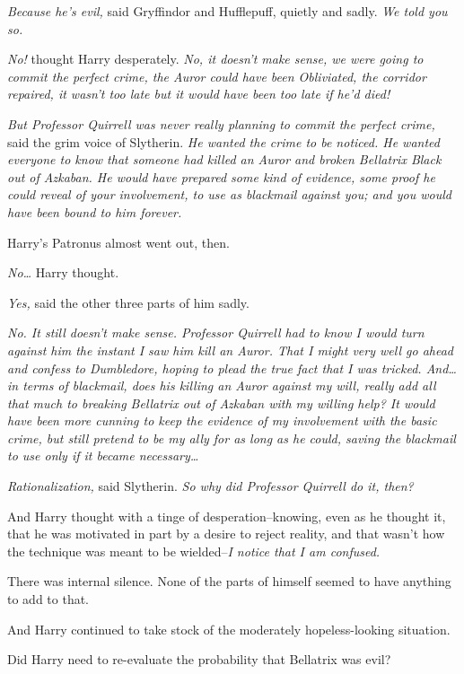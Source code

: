 \emph{Because he's evil,} said Gryffindor and Hufflepuff, quietly and sadly. \emph{We told you so.}

\emph{No!} thought Harry desperately. \emph{No, it doesn't make sense, we were going to commit the perfect crime, the Auror could have been Obliviated, the corridor repaired, it wasn't too late but it \emph{would} have been too late if he'd died!}

\emph{But Professor Quirrell was never really planning to commit the perfect crime,} said the grim voice of Slytherin. \emph{He \emph{wanted} the crime to be noticed. He wanted everyone to know that someone had killed an Auror and broken Bellatrix Black out of Azkaban. He would have prepared some kind of evidence, some proof he could reveal of your involvement, to use as blackmail against you; and you would have been bound to him forever.}

Harry's Patronus almost went out, then.

\emph{No{\ldots}} Harry thought.

\emph{Yes,} said the other three parts of him sadly.

\emph{No. It still doesn't make sense. Professor Quirrell had to know I would turn against him the instant I saw him kill an Auror. That I might very well go ahead and confess to Dumbledore, hoping to plead the true fact that I was tricked. And{\ldots} in terms of blackmail, does his killing an Auror against my will, really add all \emph{that} much to breaking Bellatrix out of Azkaban with my willing help? It would have been more cunning to keep the evidence of my involvement with the basic crime, but still pretend to be my ally for as long as he could, saving the blackmail to use only if it became necessary{\ldots}}

\emph{Rationalization,} said Slytherin. \emph{So why \emph{did} Professor Quirrell do it, then?}

And Harry thought with a tinge of desperation\---knowing, even as he thought it, that he was motivated in part by a desire to reject reality, and that wasn't how the technique was meant to be wielded\---\emph{I notice that I am confused.}

There was internal silence. None of the parts of himself seemed to have anything to add to that.

And Harry continued to take stock of the moderately hopeless-looking situation.

Did Harry need to re-evaluate the probability that Bellatrix was evil?

